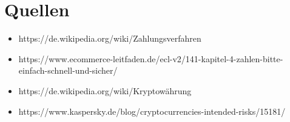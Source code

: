 
\section{Quellen}

\begin{itemize}
	\item https://de.wikipedia.org/wiki/Zahlungsverfahren
	\item https://www.ecommerce-leitfaden.de/ecl-v2/141-kapitel-4-zahlen-bitte-einfach-schnell-und-sicher/
	\item https://de.wikipedia.org/wiki/Kryptowährung
	\item https://www.kaspersky.de/blog/cryptocurrencies-intended-risks/15181/
\end{itemize}